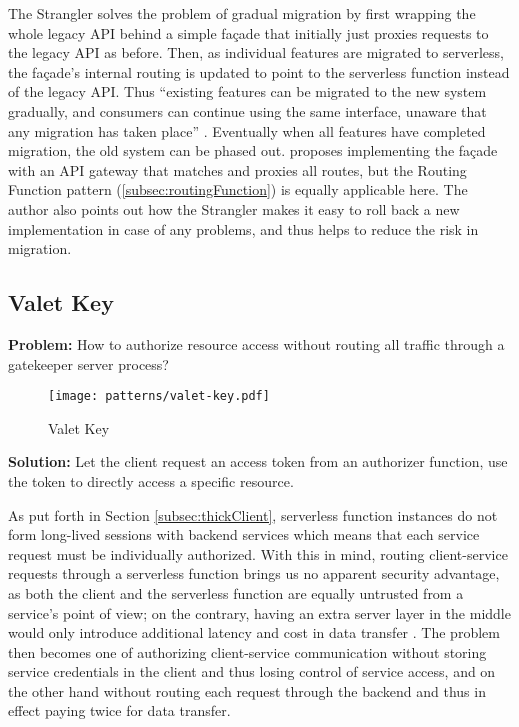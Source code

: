The Strangler solves the problem of gradual migration by first wrapping the whole legacy API behind a simple façade that initially just proxies requests to the legacy API as before. Then, as individual features are migrated to serverless, the façade's internal routing is updated to point to the serverless function instead of the legacy API. Thus ``existing features can be migrated to the new system gradually, and consumers can continue using the same interface, unaware that any migration has taken place'' \parencite{microsoft18cloudPatterns}. Eventually when all features have completed migration, the old system can be phased out. \textcite{zambrano18patterns} proposes implementing the façade with an API gateway that matches and proxies all routes, but the Routing Function pattern (\ref{subsec:routingFunction}) is equally applicable here. The author also points out how the Strangler makes it easy to roll back a new implementation in case of any problems, and thus helps to reduce the risk in migration.

\subsection{Valet Key} \label{subsec:valetKey}

\textbf{Problem:} How to authorize resource access without routing all traffic through a gatekeeper server process?

\begin{figure}[h]
  \centering
  \texttt{[image: patterns/valet-key.pdf]}
  \caption{Valet Key}
  \label{fig:valetKey}
\end{figure}

\textbf{Solution:} Let the client request an access token from an authorizer function, use the token to directly access a specific resource.

As put forth in Section \ref{subsec:thickClient}, serverless function instances do not form long-lived sessions with backend services which means that each service request must be individually authorized. With this in mind, routing client-service requests through a serverless function brings us no apparent security advantage, as both the client and the serverless function are equally untrusted from a service's point of view; on the contrary, having an extra server layer in the middle would only introduce additional latency and cost in data transfer \parencite{adzic2017serverless}. The problem then becomes one of authorizing client-service communication without storing service credentials in the client and thus losing control of service access, and on the other hand without routing each request through the backend and thus in effect paying twice for data transfer.

